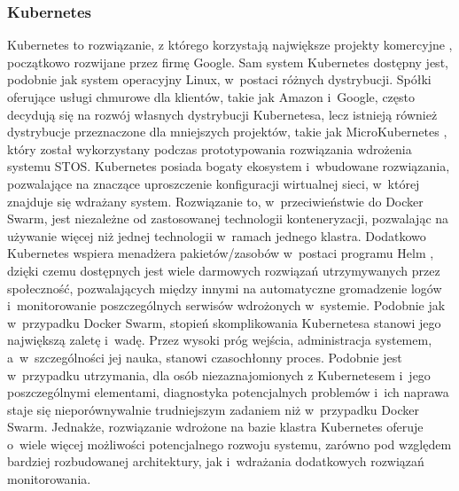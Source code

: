 \subsubsection{Kubernetes}
Kubernetes to rozwiązanie, z którego korzystają największe projekty komercyjne \cite{googleKubernetes}, początkowo rozwijane przez firmę Google. Sam system Kubernetes dostępny jest, podobnie jak system operacyjny Linux, w~postaci różnych dystrybucji. Spółki oferujące usługi chmurowe dla klientów, takie jak Amazon i~Google, często decydują się na rozwój własnych dystrybucji Kubernetesa, lecz istnieją również dystrybucje przeznaczone dla mniejszych projektów, takie jak MicroKubernetes \cite{microk8s}, który został wykorzystany podczas prototypowania rozwiązania wdrożenia systemu STOS. Kubernetes posiada bogaty ekosystem i~wbudowane rozwiązania, pozwalające na znaczące uproszczenie konfiguracji wirtualnej sieci, w~której znajduje się wdrażany system. Rozwiązanie to, w~przeciwieństwie do Docker Swarm, jest niezależne od zastosowanej technologii konteneryzacji, pozwalając na używanie więcej niż jednej technologii w~ramach jednego klastra. Dodatkowo Kubernetes wspiera menadżera pakietów/zasobów w~postaci programu Helm \cite{k8sHelm}, dzięki czemu dostępnych jest wiele darmowych rozwiązań utrzymywanych przez społeczność, pozwalających między innymi na automatyczne gromadzenie logów i~monitorowanie poszczególnych serwisów wdrożonych w~systemie. Podobnie jak w~przypadku Docker Swarm, stopień skomplikowania Kubernetesa stanowi jego największą zaletę i~wadę. Przez wysoki próg wejścia, administracja systemem, a~w~szczególności jej nauka, stanowi czasochłonny proces. Podobnie jest w~przypadku utrzymania, dla osób niezaznajomionych z Kubernetesem i~jego poszczególnymi elementami, diagnostyka potencjalnych problemów i~ich naprawa staje się nieporównywalnie trudniejszym zadaniem niż w~przypadku Docker Swarm. Jednakże, rozwiązanie wdrożone na bazie klastra Kubernetes oferuje o~wiele więcej możliwości potencjalnego rozwoju systemu, zarówno pod względem bardziej rozbudowanej architektury, jak i~wdrażania dodatkowych rozwiązań monitorowania.

